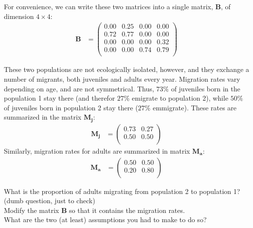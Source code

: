 \documentclass{article}\usepackage[]{graphicx}\usepackage[]{color}
\begin{document}
For convenience, we can write these two matrices into a single matrix, $\boldsymbol{B}$, of dimension $4\times 4$:
\begin{align*}\boldsymbol{B} &=%
\begin{pmatrix}{}
  0.00 & 0.25 & 0.00 & 0.00 \\ 
  0.72 & 0.77 & 0.00 & 0.00 \\ 
  0.00 & 0.00 & 0.00 & 0.32 \\ 
  0.00 & 0.00 & 0.74 & 0.79 \\ 
  \end{pmatrix}
\end{align*}

These two populations are not ecologically isolated, however, and they exchange a number of migrants, both juveniles and adults every year. 
Migration rates vary depending on age, and are not symmetrical. Thus, $73\%$ of juveniles born in the population 1 stay there (and therefor $27\%$ emigrate to population 2), while $50\%$ of juveniles born in population 2 stay there ($27\%$ emmigrate). 
These rates are summarized in the matrix $\boldsymbol{M_j}$:
\begin{align*}\boldsymbol{M_j} &=%
\begin{pmatrix}{}
  0.73 & 0.27 \\ 
  0.50 & 0.50 \\ 
  \end{pmatrix}
\end{align*}
Similarly, migration rates for adults are summarized in matrix $\boldsymbol{M_a}$:
\begin{align*}\boldsymbol{M_a} &=%
\begin{pmatrix}{}
  0.50 & 0.50 \\ 
  0.20 & 0.80 \\ 
  \end{pmatrix}
\end{align*}

What is the proportion of adults migrating from population 2 to population 1? (dumb question, just to check)\\

Modify the matrix $\boldsymbol{B}$ so that it contains the migration rates. \\
What are the two (at least) assumptions you had to make to do so? %
\end{document}

